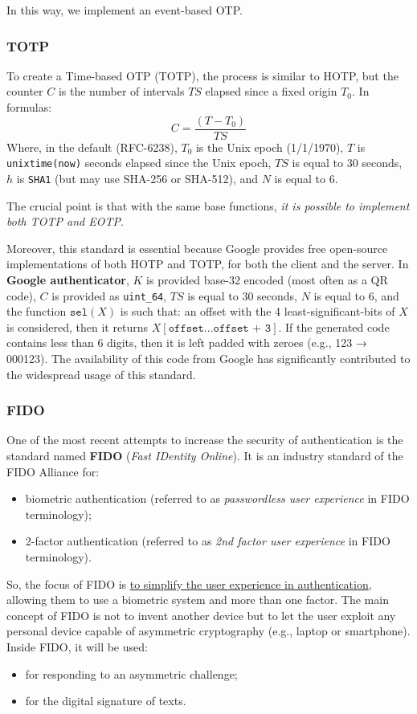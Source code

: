 In this way, we implement an event-based OTP.


\subsubsection{TOTP}
To create a Time-based OTP (TOTP), the process is similar to HOTP, but the counter \(C\) is the number of intervals \(TS\) elapsed since a fixed origin \(T_0\). In formulas:
\[ C = \frac{(T - T_0)}{TS} \]
Where, in the default (RFC-6238), \(T_0\) is the Unix epoch (1/1/1970), \(T\) is \texttt{unixtime(now)} seconds elapsed since the Unix epoch, \(TS\) is equal to 30 seconds, \(h\) is \texttt{SHA1} (but may use SHA-256 or SHA-512), and \(N\) is equal to 6.

The crucial point is that with the same base functions, \textit{it is possible to implement both TOTP and EOTP}.

Moreover, this standard is essential because Google provides free open-source implementations of both HOTP and TOTP, for both the client and the server. In \textbf{Google authenticator}, \(K\) is provided base-32 encoded (most often as a QR code), \(C\) is provided as \texttt{uint\_64}, \(TS\) is equal to 30 seconds, \(N\) is equal to 6, and the function \(\texttt{sel}(X)\) is such that: an offset with the 4 least-significant-bits of \(X\) is considered, then it returns \(X[\texttt{offset}...\texttt{offset + 3}]\). If the generated code contains less than 6 digits, then it is left padded with zeroes (e.g., 123 → 000123).
The availability of this code from Google has significantly contributed to the widespread usage of this standard.


\subsubsection{FIDO}\label{chap:fido}
One of the most recent attempts to increase the security of authentication is the standard named \textbf{FIDO} (\textit{Fast IDentity Online}). It is an industry standard of the FIDO Alliance for:
\begin{itemize}
  \item biometric authentication (referred to as \textit{passwordless user experience} in FIDO terminology);
  \item 2-factor authentication (referred to as \textit{2nd factor user experience} in FIDO terminology).
\end{itemize}

So, the focus of FIDO is \ul{to simplify the user experience in authentication}, allowing them to use a biometric system and more than one factor. The main concept of FIDO is not to invent another device but to let the user exploit any personal device capable of asymmetric cryptography (e.g., laptop or smartphone). Inside FIDO, it will be used:
\begin{itemize}
  \item for responding to an asymmetric challenge;
  \item for the digital signature of texts.
\end{itemize}

